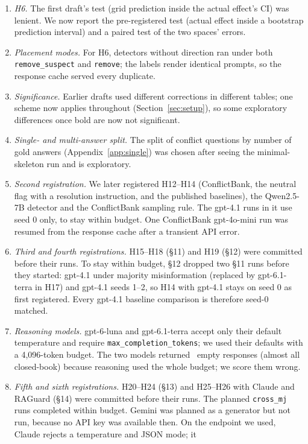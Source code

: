 \begin{enumerate}[leftmargin=*,itemsep=1pt,topsep=2pt]
the addendum after the confirmatory run, so it is post hoc.
\item \emph{H6.} The first draft's test (grid prediction inside the actual effect's CI) was
lenient. We now report the pre-registered test (actual effect inside a bootstrap prediction interval) and a paired test
of the two spaces' errors.
\item \emph{Placement modes.} For H6, detectors without direction ran under both
\texttt{remove\_suspect} and \texttt{remove}; the labels render identical prompts, so the response cache served every
duplicate.
\item \emph{Significance.} Earlier drafts used different corrections in different tables; one scheme now applies
throughout (Section~\ref{sec:setup}), so some exploratory differences once bold are now
not significant.
\item \emph{Single- and multi-answer split.} The split of conflict questions by number of gold answers
(Appendix~\ref{app:single}) was chosen after seeing the minimal-skeleton run and is exploratory.
\item \emph{Second registration.} We later registered H12--H14 (ConflictBank, the neutral flag with a
resolution instruction, and the published baselines), the Qwen2.5-7B detector and the ConflictBank sampling rule.
The gpt-4.1 runs in it use seed 0 only, to stay within budget. One ConflictBank gpt-4o-mini run was resumed from the
response cache after a transient API error.
\item \emph{Third and fourth registrations.} H15--H18 (\S11) and H19 (\S12) were committed before their runs. To stay
within budget, \S12 dropped two \S11 runs before they started: gpt-4.1 under majority misinformation (replaced by
gpt-6.1-terra in H17) and gpt-4.1 seeds 1--2, so H14 with gpt-4.1 stays on seed 0 as first registered. Every
gpt-4.1 baseline comparison is therefore seed-0 matched.
\item \emph{Reasoning models.} gpt-6-luna and gpt-6.1-terra accept only their default temperature and require
\texttt{max\_completion\_tokens}; we used their defaults with a 4,096-token budget. The two models returned
\Nempty\ empty responses (almost all closed-book) because reasoning used the whole budget; we score them wrong.
\item \emph{Fifth and sixth registrations.} H20--H24 (\S13) and H25--H26 with Claude and RAGuard (\S14) were
committed before their runs. The planned \texttt{cross\_mj} runs completed within budget. Gemini was planned
as a generator but not run, because no API key was available then. On the endpoint we used, Claude rejects a temperature and JSON mode; it

\end{enumerate}
